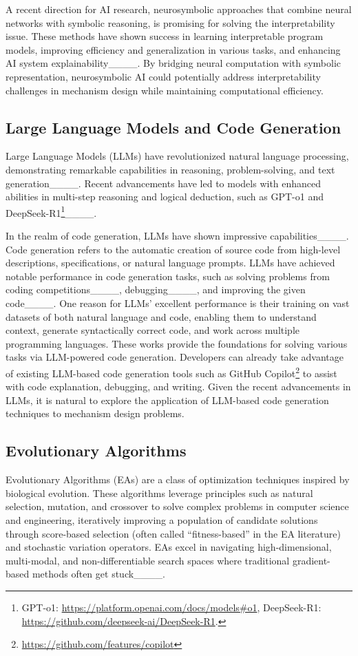 A recent direction for AI research, neurosymbolic approaches that combine neural networks with symbolic reasoning, is promising for solving the interpretability issue. These methods have shown success in learning interpretable program models, improving efficiency and generalization in various tasks, and enhancing AI system explainability____. By bridging neural computation with symbolic representation, neurosymbolic AI could potentially address interpretability challenges in mechanism design while maintaining computational efficiency.

\subsection{Large Language Models and Code Generation}
Large Language Models (LLMs) have revolutionized natural language processing, demonstrating remarkable capabilities in reasoning, problem-solving, and text generation____. Recent advancements have led to models with enhanced abilities in multi-step reasoning and logical deduction, such as GPT-o1 and DeepSeek-R1\footnote{GPT-o1: \url{https://platform.openai.com/docs/models\#o1}, DeepSeek-R1: \url{https://github.com/deepseek-ai/DeepSeek-R1}.}____.

In the realm of code generation, LLMs have shown impressive capabilities____.
Code generation refers to the automatic creation of source code from high-level descriptions, specifications, or natural language prompts. LLMs have achieved notable performance in code generation tasks, such as solving problems from coding competitions____, debugging____, and improving the given code____. One reason for LLMs' excellent performance is their training on vast datasets of both natural language and code, enabling them to understand context, generate syntactically correct code, and work across multiple programming languages.
These works provide the foundations for solving various tasks via LLM-powered code generation. 
Developers can already take advantage of existing LLM-based code generation tools such as GitHub Copilot\footnote{\url{https://github.com/features/copilot}} to assist with code explanation, debugging, and writing. 
Given the recent advancements in LLMs, it is natural to explore the application of LLM-based code generation techniques to mechanism design problems. 


\subsection{Evolutionary Algorithms}
Evolutionary Algorithms (EAs) are a class of optimization techniques inspired by biological evolution. These algorithms leverage principles such as natural selection, mutation, and crossover to solve complex problems in computer science and engineering, iteratively improving a population of candidate solutions through score-based selection (often called ``fitness-based'' in the EA literature) and stochastic variation operators. 
EAs excel in navigating high-dimensional, multi-modal, and non-differentiable search spaces where traditional gradient-based methods often get stuck____. 

